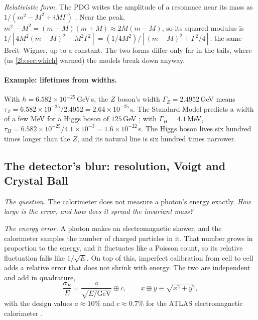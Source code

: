 \emph{Relativistic form.} The PDG writes the amplitude of a resonance near its mass as $1/(m^2-M^2+iM\Gamma)$ \cite[(49.10)]{PDG2024}. Near the peak, $m^2-M^2=(m-M)(m+M)\approx2M(m-M)$, so its squared modulus is $1/[4M^2(m-M)^2+M^2\Gamma^2]=(1/4M^2)/[(m-M)^2+\Gamma^2/4]$: the same Breit--Wigner, up to a constant. The two forms differ only far in the tails, where (as \cref{2b:sec:which} warned) the models break down anyway.

\paragraph{Example: lifetimes from widths.}
With $\hbar=6.582\times10^{-25}$\,GeV\,s, the $Z$ boson's width $\Gamma_Z=2.4952$\,GeV means $\tau_Z=6.582\times10^{-25}/2.4952=2.64\times10^{-25}$\,s. The Standard Model predicts a width of a few MeV for a Higgs boson of $125$\,GeV \cite[Sec.~4]{ChatrchyanHiggs2012}; with $\Gamma_H=4.1$\,MeV, $\tau_H=6.582\times10^{-25}/4.1\times10^{-3}=1.6\times10^{-22}$\,s. The Higgs boson lives six hundred times longer than the $Z$, and its natural line is six hundred times narrower.

\subsection{The detector's blur: resolution, Voigt and Crystal Ball}
\label{T4a:sec:resolution}

\emph{The question.} The calorimeter does not measure a photon's energy exactly. \emph{How large is the error, and how does it spread the invariant mass?}

\emph{The energy error.} A photon makes an electromagnetic shower, and the calorimeter samples the number of charged particles in it. That number grows in proportion to the energy, and it fluctuates like a Poisson count, so its relative fluctuation falls like $1/\sqrt E$. On top of this, imperfect calibration from cell to cell adds a relative error that does not shrink with energy. The two are independent and add in quadrature,
\begin{equation}
  \frac{\sigma_E}{E}=\frac{a}{\sqrt{E/\mathrm{GeV}}}\oplus c,\qquad x\oplus y\equiv\sqrt{x^2+y^2},
  \label{T4a:eq:eres}
\end{equation}
with the design values $a\approx10\%$ and $c\approx0.7\%$ for the ATLAS electromagnetic calorimeter \cite{ATLASDetector2008}.

